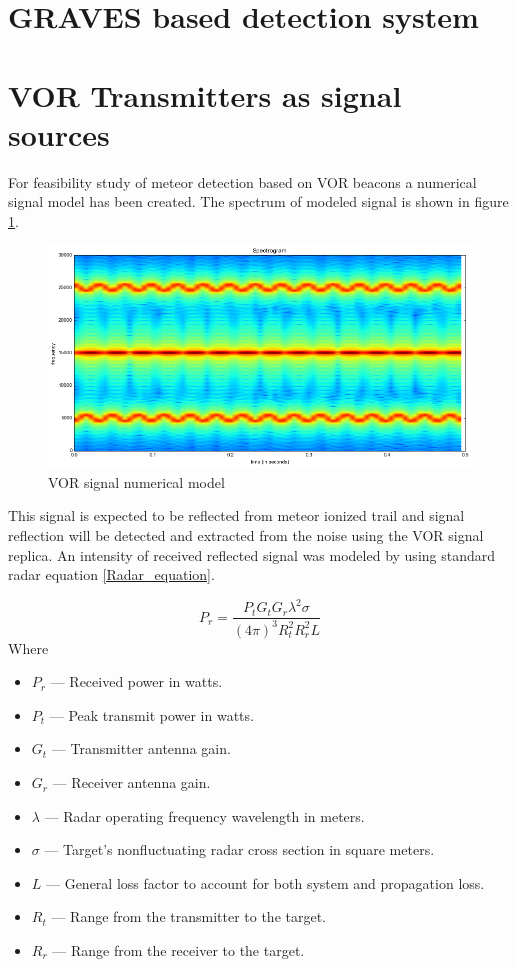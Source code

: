 \documentclass[twoside]{ctuthesis}
\theoremstyle{plain}
\theoremstyle{definition}
\theoremstyle{note}
\begin{document}
\section{GRAVES based detection system}


\section{VOR Transmitters as signal sources}

For feasibility study of meteor detection based on VOR beacons a numerical signal model has been created. The spectrum of modeled signal is shown in figure \ref{VOR_signal}.

\begin{figure}
\includegraphics[width=\textwidth]{./img/VOR_signal.png}
\caption{VOR signal numerical model}
\label{VOR_signal}
\end{figure}

This signal is expected to be reflected from meteor ionized trail and signal reflection will be detected and extracted from the noise using the VOR signal replica. An intensity of received reflected signal was modeled by using standard radar equation \ref{Radar_equation}.

\begin{equation}
P_r = \frac{P_t G_t G_r \lambda^2 \sigma}{(4 \pi)^3 R_t ^2 R_r ^2 L}
\label{Radar_equation}
\end{equation}
Where 
\begin{itemize}
\item $P_r$ — Received power in watts.
\item $P_t$ — Peak transmit power in watts.
\item $G_t$ — Transmitter antenna gain.
\item $G_r$ — Receiver antenna gain.
\item $\lambda$ — Radar operating frequency wavelength in meters.
\item $\sigma$ — Target's nonfluctuating radar cross section in square meters.
\item $L$ — General loss factor to account for both system and propagation loss.
\item $R_t$ — Range from the transmitter to the target.
\item $R_r$ — Range from the receiver to the target. 
\end{itemize}
\end{document}
